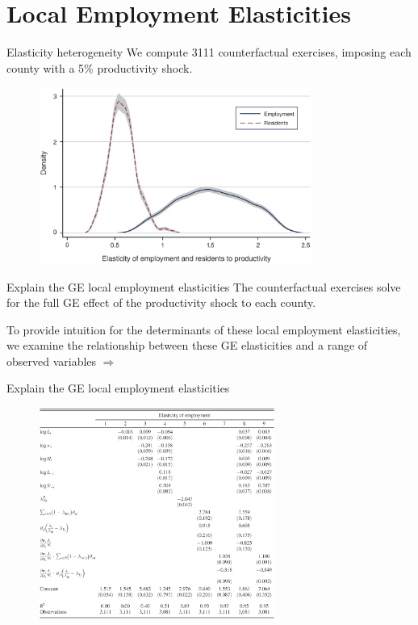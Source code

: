 \documentclass{beamer}
\begin{document}
\section{Local Employment Elasticities}
\begin{frame}[shrink]
	\transfade %
	\tableofcontents[sectionstyle=show/shaded,subsectionstyle=show/shaded/hide]
	\addtocounter{framenumber}{-1}
\end{frame}
\begin{frame}{Elasticity heterogeneity}
	We compute 3111 counterfactual exercises, imposing each county with a 5\% productivity shock.
	\begin{figure}[htbp]
		\centering
		\includegraphics[width=0.8\textwidth]{fig2.png}
	\end{figure}
\end{frame}
\begin{frame}{Explain the GE local employment elasticities}
	The counterfactual exercises solve for the full GE effect of the productivity shock to each county.
	\medskip

	To provide intuition for the determinants of these local employment elasticities, we examine the relationship between these GE elasticities and a range of observed variables $\Rightarrow$
\end{frame}
\begin{frame}{Explain the GE local employment elasticities}
	\begin{figure}[htbp]
		\centering
		\includegraphics[width=0.69\textwidth]{tab2.png}		
	\end{figure}
\end{frame}
\end{document}
